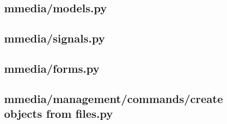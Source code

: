 \subsection{mmedia/models.py}


\subsection{mmedia/signals.py}


\subsection{mmedia/forms.py}


\subsection{mmedia/management/commands/create objects from files.py}

